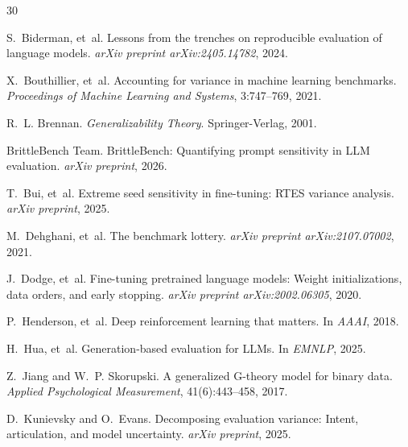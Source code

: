 \documentclass[letterpaper]{article}
\begin{document}


\begin{thebibliography}{30}

S.~Biderman, et~al.
\newblock Lessons from the trenches on reproducible evaluation of language models.
\newblock \emph{arXiv preprint arXiv:2405.14782}, 2024.

X.~Bouthillier, et~al.
\newblock Accounting for variance in machine learning benchmarks.
\newblock \emph{Proceedings of Machine Learning and Systems}, 3:747--769, 2021.

R.~L. Brennan.
\newblock \emph{Generalizability Theory}.
\newblock Springer-Verlag, 2001.

BrittleBench Team.
\newblock BrittleBench: Quantifying prompt sensitivity in LLM evaluation.
\newblock \emph{arXiv preprint}, 2026.

T.~Bui, et~al.
\newblock Extreme seed sensitivity in fine-tuning: RTES variance analysis.
\newblock \emph{arXiv preprint}, 2025.

M.~Dehghani, et~al.
\newblock The benchmark lottery.
\newblock \emph{arXiv preprint arXiv:2107.07002}, 2021.

J.~Dodge, et~al.
\newblock Fine-tuning pretrained language models: Weight initializations, data orders, and early stopping.
\newblock \emph{arXiv preprint arXiv:2002.06305}, 2020.

P.~Henderson, et~al.
\newblock Deep reinforcement learning that matters.
\newblock In \emph{AAAI}, 2018.

H.~Hua, et~al.
\newblock Generation-based evaluation for LLMs.
\newblock In \emph{EMNLP}, 2025.

Z.~Jiang and W.~P. Skorupski.
\newblock A generalized G-theory model for binary data.
\newblock \emph{Applied Psychological Measurement}, 41(6):443--458, 2017.

D.~Kunievsky and O.~Evans.
\newblock Decomposing evaluation variance: Intent, articulation, and model uncertainty.
\newblock \emph{arXiv preprint}, 2025.


\end{thebibliography}
\end{document}
